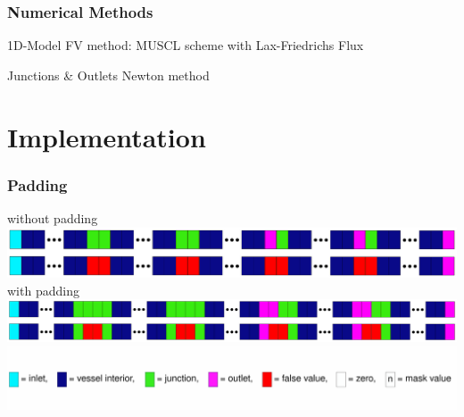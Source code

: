 \documentclass{beamer}
\begin{document}
\begin{frame}
	\frametitle{Numerical Methods}
	\begin{block}{1D-Model}
		FV method: MUSCL scheme with Lax-Friedrichs Flux
	\end{block}
	\begin{block}{Junctions \& Outlets}
		Newton method
	\end{block}


\end{frame}

\section{Implementation}

%
%
\begin{frame}
	\frametitle{Padding}
	without padding
	\includegraphics[width=\textwidth]{images/padding1.eps}
	with padding
	\includegraphics[width=\textwidth]{images/padding2.eps}
	\includegraphics[width=\textwidth]{images/legend.eps}
\end{frame}
\end{document}
